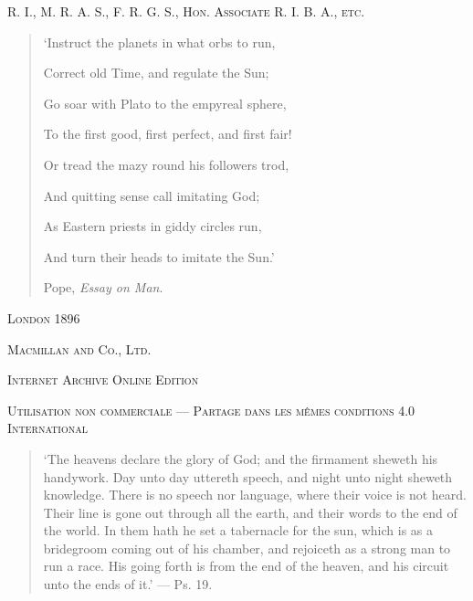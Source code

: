 \documentclass[a4paper, 11pt, oneside, polutonikogreek, english]{article}
\begin{document}
\begin{titlepage}
	\vspace*{1\baselineskip} %
	
    {\scshape\scriptsize R. I., M. R. A. S., F. R. G. S., Hon. Associate R. I. B. A., etc.} %
  
    \vspace{3\baselineskip}
    
        \begin{quotation}\small
`Instruct the planets in what orbs to run,

Correct old Time, and regulate the Sun;

Go soar with Plato to the empyreal sphere,

To the first good, first perfect, and first fair!

Or tread the mazy round his followers trod,

And quitting sense call imitating God;

As Eastern priests in giddy circles run,

And turn their heads to imitate the Sun.'

\hspace*{40mm}Pope, \emph{Essay on Man}.
        \end{quotation}

  
    \vspace*{\fill}

	\vspace{1\baselineskip}

	{\small\scshape London 1896}
	
	{\small\scshape{Macmillan and Co., Ltd.}}
	
	\vspace{0.5\baselineskip} %

    \scshape Internet Archive Online Edition  %
	
	{\scshape\small Utilisation non commerciale --- Partage dans les mêmes conditions 4.0 International} %
\end{titlepage}
\setlength{\parskip}{1mm plus1mm minus1mm}
\clearpage
\tableofcontents
\clearpage
\listoffigures
\clearpage
\begin{quotation}\small
`The heavens declare the glory of God; and the firmament sheweth his handywork. Day unto day uttereth speech, and night unto night sheweth knowledge. There is no speech nor language, where their voice is not heard. Their line is gone out through all the earth, and their words to the end of the world. In them hath he set a tabernacle for the sun, which is as a bridegroom coming out of his chamber, and rejoiceth as a strong man to run a race. His going forth is from the end of the heaven, and his circuit unto the ends of it.' --- Ps. 19.
\end{quotation}
\end{document}
